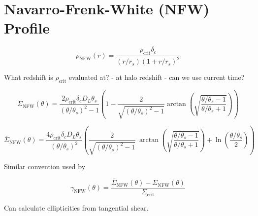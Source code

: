 \documentclass[10pt]{article}
\begin{document}
\section{Navarro-Frenk-White (NFW) Profile}

\begin{equation}
\rho_\mathrm{NFW}(r) = \frac{\rho_\mathrm{crit} \delta_c}{(r/r_s)\left(1 + r/r_s\right)^2}
\end{equation}

What redshift is $\rho_\mathrm{crit}$ evaluated at? - at halo redshift - can we use current time?

%
%
%

\begin{equation}
\Sigma_\mathrm{NFW}(\theta) = \frac{2 \rho_\mathrm{crit} \delta_c D_L \theta_s}{(\theta/\theta_s)^2 - 1} \left(1 - \frac{2}{\sqrt{(\theta/\theta_s)^2 - 1}} \arctan\left(\sqrt{\frac{\theta/\theta_s - 1}{\theta/\theta_s + 1}} \right) \right)
\end{equation}

\begin{equation}
\overline{\Sigma}_\mathrm{NFW}(\theta) = \frac{4 \rho_\mathrm{crit} \delta_c D_L \theta_s}{(\theta/\theta_s)^2} \left(
    \frac{2}{\sqrt{(\theta/\theta_s)^2 - 1}} ~\arctan\left(\sqrt{\frac{\theta/\theta_s - 1}{\theta/\theta_s + 1}} \right) + \ln{\left(\frac{\theta/\theta_s}{2}\right)}
\right)
\end{equation}

Similar convention used by \citet{Bartelmann2001}

\begin{equation}
\gamma_\mathrm{NFW}(\theta) = \frac{\overline{\Sigma}_\mathrm{NFW}(\theta) - \Sigma_\mathrm{NFW}(\theta)}{\Sigma_\mathrm{crit}}
\end{equation}

Can calculate ellipticities from tangential shear.
\end{document}
